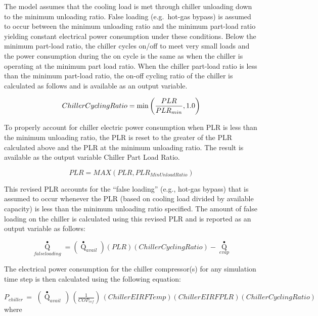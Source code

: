 The model assumes that the cooling load is met through chiller unloading down to the minimum unloading ratio. False loading (e.g.~hot-gas bypass) is assumed to occur between the minimum unloading ratio and the minimum part-load ratio yielding constant electrical power consumption under these conditions. Below the minimum part-load ratio, the chiller cycles on/off to meet very small loads and the power consumption during the on cycle is the same as when the chiller is operating at the minimum part load ratio. When the chiller part-load ratio is less than the minimum part-load ratio, the on-off cycling ratio of the chiller is calculated as follows and is available as an output variable.

\begin{equation}
  ChillerCyclingRatio = \min \left( \frac{PLR}{PLR_{min}}, 1.0 \right)
\end{equation}

To properly account for chiller electric power consumption when PLR is less than the minimum unloading ratio, the PLR is reset to the greater of the PLR calculated above and the PLR at the minimum unloading ratio. The result is available as the output variable Chiller Part Load Ratio.

\begin{equation}
PLR = MAX(PLR,PL{R_{MinUnloadRatio}})
\end{equation}

This revised PLR accounts for the ``false loading'' (e.g., hot-gas bypass) that is assumed to occur whenever the PLR (based on cooling load divided by available capacity) is less than the minimum unloading ratio specified. The amount of false loading on the chiller is calculated using this revised PLR and is reported as an output variable as follows:

\begin{equation}
{\mathop Q\limits^ \bullet_{falseloading}} = \left( {{{\mathop Q\limits^ \bullet  }_{avail}}} \right)\left( {PLR} \right)\left( {ChillerCyclingRatio} \right) - {\mathop Q\limits^ \bullet_{evap}}
\end{equation}

The electrical power consumption for the chiller compressor(s) for any simulation time step is then calculated using the following equation:

\({P_{chiller}}\, = \,\,\left( {{{\mathop Q\limits^ \bullet }_{avail}}\,} \right)\,\left( {\frac{1}{{CO{P_{ref}}}}} \right)\,\left( {ChillerEIRFTemp} \right)\left( {ChillerEIRFPLR} \right)\left( {ChillerCyclingRatio} \right)\) where

